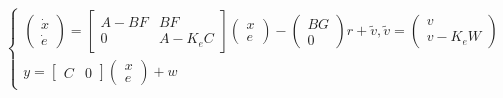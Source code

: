 \documentclass[12pt, a4paper]{article}
\begin{document}
\begin{enumerate}[1.]
\begin{enumerate}[(a)]
        $\begin{cases} 
            \begin{pmatrix}
                \dot{x}  \\
                \dot{e} 
                \end{pmatrix}=\begin{bmatrix} 
                A-BF & BF \\
                0 & A-K_eC
                \end{bmatrix} \begin{pmatrix}
                    x\\
                    e
                \end{pmatrix}-\begin{pmatrix}
                    BG\\
                    0
                \end{pmatrix}r+\widetilde{v} ,\widetilde{v}=\begin{pmatrix}
                    v\\
                    v-K_eW
                \end{pmatrix}\\
                y=\begin{bmatrix} 
                    C&0
                    \end{bmatrix}\begin{pmatrix}
                    x\\
                    e
                \end{pmatrix}+w
        \end{cases}$\\


\end{enumerate}
\end{enumerate}
\end{document}
